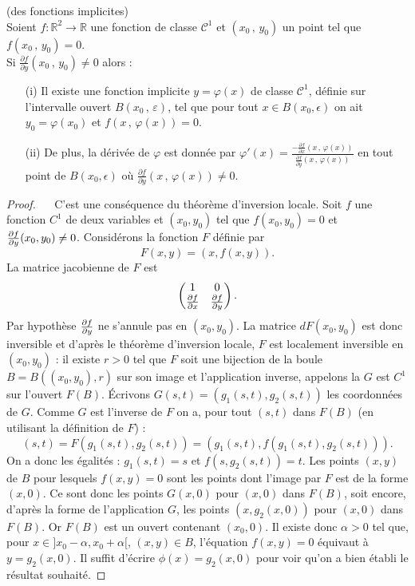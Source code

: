 \documentclass[class=report,crop=false]{standalone}
\begin{document}
{{{{{{{{{{\begin{theoreme} (des fonctions implicites)\\
Soient $f : \mathbb{R}^2 \rightarrow \mathbb{R}$ une fonction de classe $\mathcal{C}^1$ et $(x_{0}\,,\,y_{0})$ un point tel que $f(x_{0}\,,\,y_{0}) = 0$.\\
Si $\displaystyle \frac{\partial f}{\partial y}(x_{0}\,,\,y_{0}) \neq 0$ alors :
\begin{enumerate}
\item[(i)] Il existe une fonction implicite $y = \varphi(x)$ de classe $\mathcal{C}^1$, définie sur l'intervalle ouvert $B(x_{0}\,,\,\varepsilon)$, tel que pour tout $x\in B(x_0,\epsilon)$ on ait $y_{0} = \varphi(x_{0})$ et $f(x\,,\,\varphi(x)) = 0$.
\item[(ii)] De plus, la dérivée de $\varphi$ est donnée par $\displaystyle \varphi'(x) = \frac{-\frac{\partial f}{\partial x}(x\,,\, \varphi(x))}{\frac{\partial f}{\partial y}(x\,,\, \varphi(x))}$ en tout point de $B(x_0,\epsilon)$ o\`u $\displaystyle \frac{\partial f}{\partial y}(x\,,\,\varphi(x)) \neq 0$.
\end{enumerate}
\end{theoreme}
\begin{proof} ~~
C'est une conséquence du théor\`eme d'inversion locale. Soit $f$ une fonction $C^1$ de deux variables et $(x_0,y_0)$ tel que $f(x_0,y_0)=0$ et ${{\partial f}\over{\partial y}}(x_0,y_0)\neq 0$. Considérons la fonction $F$ définie par
$$
F(x,y)=(x,f(x,y)).
$$
La matrice jacobienne de $F$ est
$$
\begin{pmatrix}  1&0\\ {{\partial f}\over{\partial x}} & {{\partial f}\over{\partial y}}  \end{pmatrix}.
$$
Par hypoth\`ese ${{\partial f}\over{\partial y}}$ ne s'annule pas en $(x_0,y_0)$. La matrice $dF(x_0,y_0)$ est donc inversible et d'apr\`es le théor\`eme d'inversion locale, $F$ est localement inversible en $(x_0,y_0)$ : il existe $r>0$ tel que $F$ soit une bijection de la boule $B=B((x_0,y_0),r)$ sur son image et l'application inverse, appelons la $G$ est $C^1$ sur l'ouvert $F(B)$. \'Ecrivons $G(s,t)=(g_1(s,t),g_2(s,t))$ les coordonnées de $G$. Comme $G$ est l'inverse de $F$ on a, pour tout $(s,t)$ dans $F(B)$ (en utilisant la définition de $F$) :
$$
(s,t)=F(g_1(s,t),g_2(s,t))=(g_1(s,t),f(g_1(s,t),g_2(s,t))).
$$
On a donc les égalités : $g_1(s,t)=s$ et $f(s,g_2(s,t))=t$.
Les points $(x,y)$ de $B$ pour lesquels $f(x,y)=0$ sont les points dont l'image par $F$ est de la forme $(x,0)$. Ce sont donc les points $G(x,0)$ pour $(x,0)$ dans $F(B)$, soit encore, d'apr\`es la forme de l'application $G$, les points $(x,g_2(x,0))$ pour $(x,0)$ dans $F(B)$. Or $F(B)$ est un ouvert contenant $(x_0,0)$. Il existe donc $\alpha>0$ tel que, pour $x\in]x_0-\alpha,x_0+\alpha[$, $(x,y)\in B$, l'équation $f(x,y)=0$ équivaut \`a $y=g_2(x,0)$. Il suffit d'écrire $\phi(x)=g_2(x,0)$ pour voir qu'on a bien établi le résultat souhaité.
\end{proof}

}}}}}}}}}}
\end{document}
